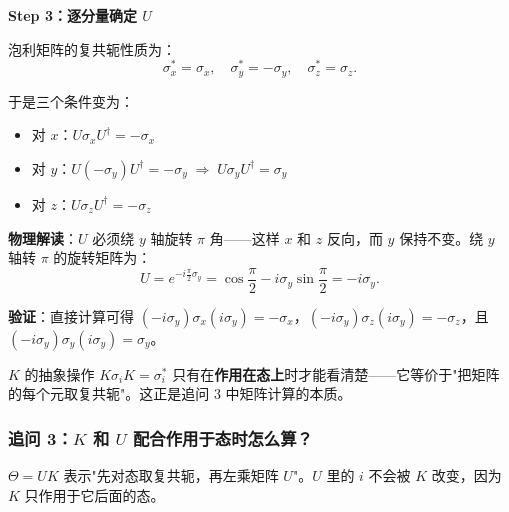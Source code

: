 \textbf{Step 3：逐分量确定 $U$}

泡利矩阵的复共轭性质为：
\[
\sigma_x^* = \sigma_x, \quad \sigma_y^* = -\sigma_y, \quad \sigma_z^* = \sigma_z.
\]

于是三个条件变为：
\begin{itemize}[nosep]
    \item 对 $x$：$U\sigma_x U^\dagger = -\sigma_x$
    \item 对 $y$：$U(-\sigma_y)U^\dagger = -\sigma_y \;\Rightarrow\; U\sigma_y U^\dagger = \sigma_y$
    \item 对 $z$：$U\sigma_z U^\dagger = -\sigma_z$
\end{itemize}

\textbf{物理解读}：$U$ 必须绕 $y$ 轴旋转 $\pi$ 角——这样 $x$ 和 $z$ 反向，而 $y$ 保持不变。绕 $y$ 轴转 $\pi$ 的旋转矩阵为：
\[
U = e^{-i\frac{\pi}{2}\sigma_y} = \cos\frac{\pi}{2} - i\sigma_y \sin\frac{\pi}{2} = -i\sigma_y.
\]

\textbf{验证}：直接计算可得 $(-i\sigma_y)\sigma_x(i\sigma_y) = -\sigma_x$，$(-i\sigma_y)\sigma_z(i\sigma_y) = -\sigma_z$，且 $(-i\sigma_y)\sigma_y(i\sigma_y) = \sigma_y$。

\begin{tipbox}[关键观察]
$K$ 的抽象操作 $K\sigma_i K = \sigma_i^*$ 只有在\textbf{作用在态上}时才能看清楚——它等价于"把矩阵的每个元取复共轭"。这正是追问 3 中矩阵计算的本质。
\end{tipbox}

\subsubsection*{追问 3：$K$ 和 $U$ 配合作用于态时怎么算？}

$\Theta = UK$ 表示"先对态取复共轭，再左乘矩阵 $U$"。$U$ 里的 $i$ 不会被 $K$ 改变，因为 $K$ 只作用于它后面的态。


